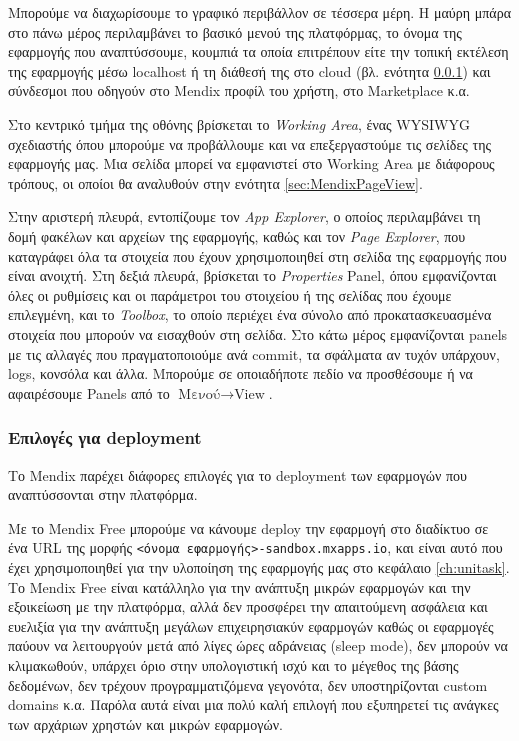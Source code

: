        Μπορούμε να διαχωρίσουμε το γραφικό περιβάλλον σε τέσσερα μέρη. Η μαύρη μπάρα στο πάνω μέρος περιλαμβάνει το βασικό μενού της πλατφόρμας, το όνομα της εφαρμογής που αναπτύσσουμε, κουμπιά τα οποία επιτρέπουν είτε την τοπική εκτέλεση της εφαρμογής μέσω localhost ή τη διάθεσή της στο cloud (βλ. ενότητα \ref{sec:MendixDeployment}) και σύνδεσμοι που οδηγούν στο Mendix προφίλ του χρήστη, στο Marketplace κ.α.

        Στο κεντρικό τμήμα της οθόνης βρίσκεται το \textit{Working Area}, ένας WYSIWYG σχεδιαστής όπου μπορούμε να προβάλλουμε και να επεξεργαστούμε τις σελίδες της εφαρμογής μας. Μια σελίδα μπορεί να εμφανιστεί στο Working Area με διάφορους τρόπους, οι οποίοι θα αναλυθούν στην ενότητα \ref{sec:MendixPageView}.

        Στην αριστερή πλευρά, εντοπίζουμε τον \textit{App Explorer}, ο οποίος περιλαμβάνει τη δομή φακέλων και αρχείων της εφαρμογής, καθώς και τον \textit{Page Explorer}, που καταγράφει όλα τα στοιχεία που έχουν χρησιμοποιηθεί στη σελίδα της εφαρμογής που είναι ανοιχτή. Στη δεξιά πλευρά, βρίσκεται το \textit{Properties} Panel, όπου εμφανίζονται όλες οι ρυθμίσεις και οι παράμετροι του στοιχείου ή της σελίδας που έχουμε επιλεγμένη, και το \textit{Toolbox}, το οποίο περιέχει ένα σύνολο από προκατασκευασμένα στοιχεία που μπορούν να εισαχθούν στη σελίδα. Στο κάτω μέρος εμφανίζονται panels με τις αλλαγές που πραγματοποιούμε ανά commit, τα σφάλματα αν τυχόν υπάρχουν, logs, κονσόλα και άλλα. Μπορούμε σε οποιαδήποτε πεδίο να προσθέσουμε ή να αφαιρέσουμε Panels από το $ \text{Μενού} \rightarrow \text{View} $. \cite{mendixDoc}

        \subsubsection{Επιλογές για deployment} \label{sec:MendixDeployment}
            Το Mendix παρέχει διάφορες επιλογές για το deployment των εφαρμογών που αναπτύσσονται στην πλατφόρμα.

            Με το Mendix Free μπορούμε να κάνουμε deploy την εφαρμογή στο διαδίκτυο σε ένα URL της μορφής \texttt{<όνομα εφαρμογής>-sandbox.mxapps.io}, και είναι αυτό που έχει χρησιμοποιηθεί για την υλοποίηση της εφαρμογής μας στο κεφάλαιο \ref{ch:unitask}. Το Mendix Free είναι κατάλληλο για την ανάπτυξη μικρών εφαρμογών και την εξοικείωση με την πλατφόρμα, αλλά δεν προσφέρει την απαιτούμενη ασφάλεια και ευελιξία για την ανάπτυξη μεγάλων επιχειρησιακύν εφαρμογών καθώς οι εφαρμογές παύουν να λειτουργούν μετά από λίγες ώρες αδράνειας (sleep mode), δεν μπορούν να κλιμακωθούν, υπάρχει όριο στην υπολογιστική ισχύ και το μέγεθος της βάσης δεδομένων, δεν τρέχουν προγραμματιζόμενα γεγονότα, δεν υποστηρίζονται custom domains κ.α. Παρόλα αυτά είναι μια πολύ καλή επιλογή που εξυπηρετεί τις ανάγκες των αρχάριων χρηστών και μικρών εφαρμογών. \cite{mendixCloud}

